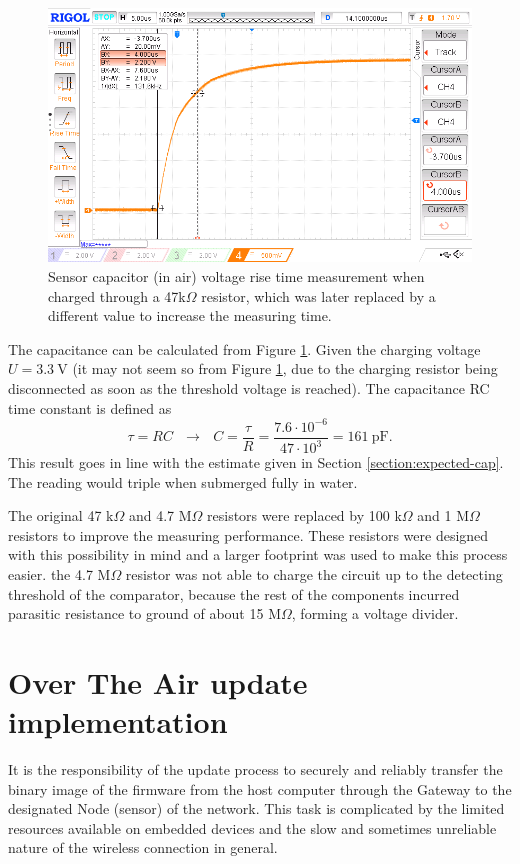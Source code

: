 \begin{figure}
    \includegraphics[width=\textwidth]{fig/cap-measure-inv.png}
    \caption{\label{fig:cap-measure}Sensor capacitor (in air) voltage rise time measurement when charged through a 47k$\Omega$ resistor, which was later replaced by a different value to increase the measuring time.}
\end{figure}

The capacitance can be calculated from Figure \ref{fig:cap-measure}. Given the charging voltage $U = 3.3~\mathrm{V}$ (it may not seem so from Figure \ref{fig:cap-measure}, due to the charging resistor being disconnected as soon as the threshold voltage is reached). The capacitance RC time constant is defined as
\begin{equation} %
    \tau = RC ~~~\rightarrow~~~ C = \dfrac{\tau}{R} = \dfrac{7.6 \cdot 10^{-6}}{47 \cdot 10^3} = 161~\mathrm{pF}.
\end{equation}
This result goes in line with the estimate given in Section \ref{section:expected-cap}. The reading would triple when submerged fully in water.

The original 47 k$\Omega$ and 4.7 M$\Omega$ resistors were replaced by 100 k$\Omega$ and 1 M$\Omega$ resistors to improve the measuring performance. These resistors were designed with this possibility in mind and a larger footprint was used to make this process easier. the 4.7 M$\Omega$ resistor was not able to charge the circuit up to the detecting threshold of the comparator, because the rest of the components incurred parasitic resistance to ground of about 15 M$\Omega$, forming a voltage divider.

\FloatBarrier
\section{Over The Air update implementation}
It is the responsibility of the update process to securely and reliably transfer the binary image of the firmware from the host computer through the Gateway to the designated Node (sensor) of the network. This task is complicated by the limited resources available on embedded devices and the slow and sometimes unreliable nature of the wireless connection in general.

